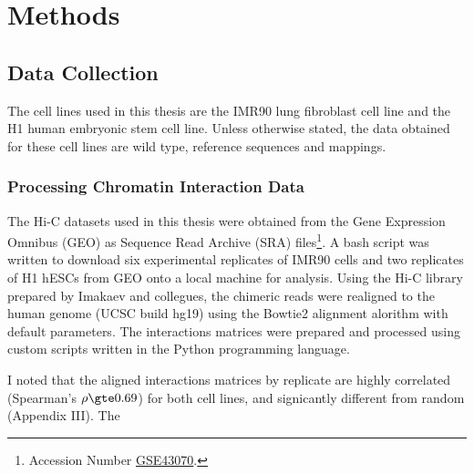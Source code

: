 \documentclass[phd,tocprelim]{cornell}
\begin{document}


\chapter{Methods}

\section{Data Collection}

The cell lines used in this thesis are the IMR90 lung fibroblast cell line and the H1 human embryonic stem
cell line.  Unless otherwise stated, the data obtained for these cell lines are wild type, reference sequences
and mappings.

\subsection{Processing Chromatin Interaction Data}

The Hi-C datasets used in this thesis were obtained from the Gene Expression Omnibus (GEO)\cite{edgar2002}
as Sequence Read Archive (SRA) files\footnote{Accession Number %
\href{http://www.ncbi.nlm.nih.gov/geo/query/acc.cgi?acc=GSE43070}{GSE43070}.}.  A bash script was written
to download six experimental replicates of IMR90 cells and two replicates of H1 hESCs from GEO onto a
local machine for analysis.  Using the Hi-C library prepared by Imakaev and collegues\cite{imakaev2012},
the chimeric reads were realigned to the human genome (UCSC build hg19) using the Bowtie2 alignment
alorithm\cite{langmead2012} with default parameters.  The interactions matrices were prepared and processed
using custom scripts written in the Python programming language.

I noted that the aligned interactions matrices by replicate are highly correlated (Spearman's $\rho \gte 0.69$)  %
for both cell lines, and signicantly different from random (Appendix III).  The 

\end{document}
